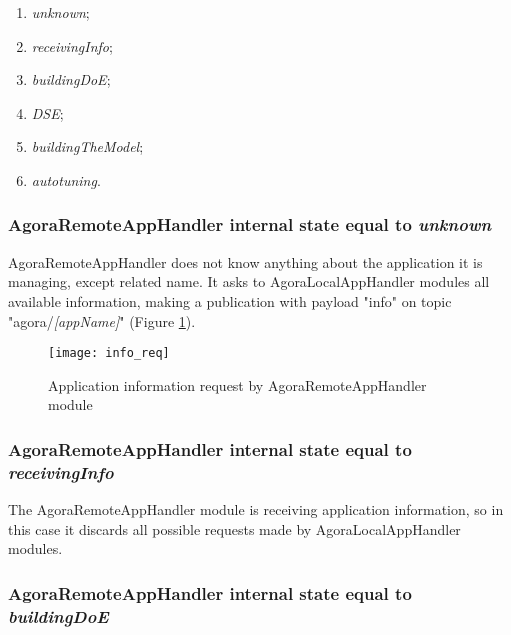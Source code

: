 \begin{enumerate}

    \item \textit{unknown};

    \item \textit{receivingInfo};

    \item \textit{buildingDoE};

    \item \textit{DSE};

    \item \textit{buildingTheModel};

    \item \textit{autotuning}.

\end{enumerate}


\subsubsection{AgoraRemoteAppHandler internal state equal to \textit{unknown}}\label{req_info}

AgoraRemoteAppHandler does not know anything about the application it is managing, except related name. It asks to AgoraLocalAppHandler modules all available information, making a publication with payload "info" on topic "agora/\textit{[appName]}" (Figure \ref{fig::remotInfoReq}).

\begin{figure}[ht]

    \centering
    \texttt{[image: info\_req]}
    \caption{Application information request by AgoraRemoteAppHandler module}

    \label{fig::remotInfoReq}
    
\end{figure}


\subsubsection{AgoraRemoteAppHandler internal state equal to \textit{receivingInfo}}

The AgoraRemoteAppHandler module is receiving application information, so in this case it discards all possible requests made by AgoraLocalAppHandler modules.


\subsubsection{AgoraRemoteAppHandler internal state equal to \textit{buildingDoE}}

